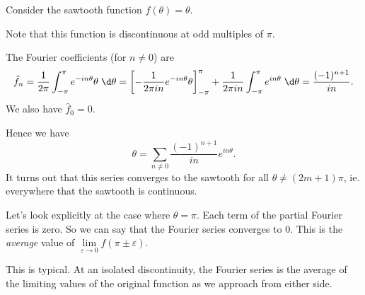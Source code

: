 \documentclass[a4paper]{article}
\begin{document}
\begin{eg}
  Consider the sawtooth function $f(\theta) = \theta$.
  \begin{center}
  \end{center}
  Note that this function is discontinuous at odd multiples of $\pi$.

  The Fourier coefficients (for $n \not= 0$) are
  \[
    \hat{f}_n = \frac{1}{2\pi}\int_{-\pi}^\pi e^{-in\theta}\theta\;\d \theta = \left[-\frac{1}{2\pi i n}e^{-in\theta}\theta\right]_{-\pi}^\pi + \frac{1}{2\pi i n}\int_{-\pi}^\pi e^{in\theta}\;\d \theta = \frac{(-1)^{n + 1}}{in}.
  \]
  We also have $\hat{f}_0 = 0$.

  Hence we have
  \[
    \theta = \sum_{n \not= 0}\frac{(-1)^{n + 1}}{in}e^{in\theta}.
  \]
  It turns out that this series converges to the sawtooth for all $\theta \not= (2m + 1)\pi$, ie. everywhere that the sawtooth is continuous.

  Let's look explicitly at the case where $\theta = \pi$. Each term of the partial Fourier series is zero. So we can say that the Fourier series converges to 0. This is the \emph{average} value of $\lim\limits_{\varepsilon \to 0} f(\pi \pm \varepsilon)$.

  This is typical. At an isolated discontinuity, the Fourier series is the average of the limiting values of the original function as we approach from either side.
\end{eg}
\end{document}
